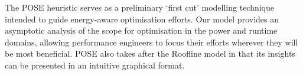 The POSE heuristic serves as a preliminary `first cut' modelling technique intended to guide energy-aware optimisation efforts.
Our model provides an asymptotic analysis of the scope for optimisation in the power and runtime domains, allowing performance engineers to focus their efforts wherever they will be most beneficial.
POSE also takes after the Roofline model in that its insights can be presented in an intuitive graphical format.
